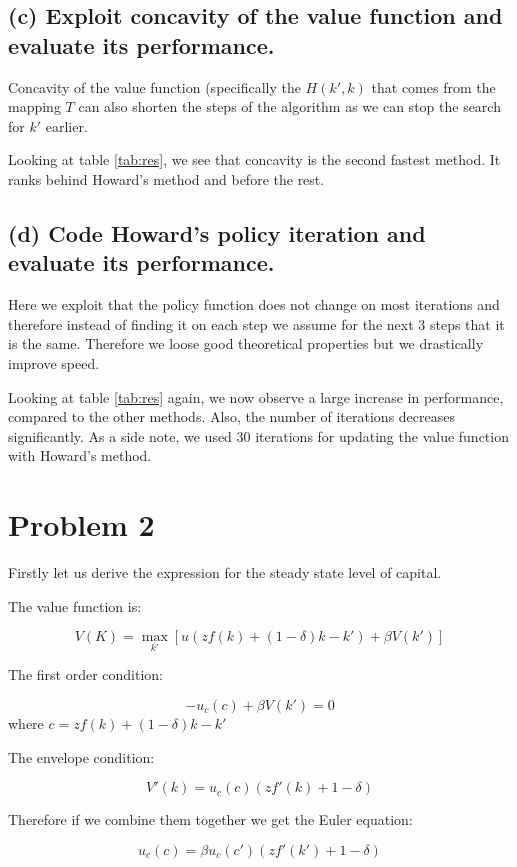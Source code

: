 \documentclass[12pt]{article}
\newcommand{\?}{\stackrel{?}{=}}
\begin{document}
\subsection*{(c) Exploit concavity of the value function and evaluate its performance.}

Concavity of the value function (specifically the $H(k',k)$ that comes from the mapping $T$ can also shorten the steps of the algorithm as we can stop the search for $k'$ earlier.

Looking at table \ref{tab:res}, we see that concavity is the second fastest method. It ranks behind Howard's method and before the rest.

\subsection*{(d) Code Howard's policy iteration and evaluate its performance.}

Here we exploit that the policy function does not change on most iterations and therefore instead of finding it on each step we assume for the next $3$ steps that it is the same. Therefore we loose good theoretical properties but we drastically improve speed.

Looking at table \ref{tab:res} again, we now observe a large increase in performance, compared to the other methods. Also, the number of iterations decreases significantly. As a side note, we used 30 iterations for updating the value function with Howard's method.




\section*{Problem 2}

Firstly let us derive the expression for the steady state level of capital.

The value function is:

\[
V(K) = \max_{k'} [ u(zf(k) + (1-\delta)k - k') + \beta V(k')]
\]

The first order condition:

\[
-u_c (c) + \beta V(k') = 0
\]
where $c = zf(k) + (1-\delta)k - k'$

The envelope condition:

\[
V'(k) = u_c (c) (zf'(k) + 1-\delta)
\]

Therefore if we combine them together we get the Euler equation:

\[
u_c (c) = \beta u_c (c') (zf'(k') + 1-\delta) 
\]
\end{document}
